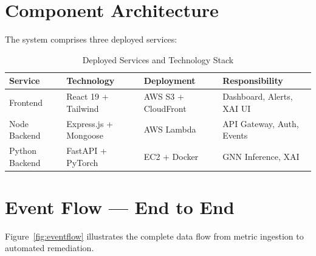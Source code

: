 \documentclass[12pt,a4paper]{report}
\begin{document}
\section{Component Architecture}

The system comprises three deployed services:

\begin{table}[H]
\centering
\caption{Deployed Services and Technology Stack}
\begin{tabular}{p{2.5cm} p{3.5cm} p{3.5cm} p{4cm}}
\toprule
\textbf{Service} & \textbf{Technology} & \textbf{Deployment} &
\textbf{Responsibility} \\
\midrule
Frontend         & React 19 + Tailwind     & AWS S3 + CloudFront &
  Dashboard, Alerts, XAI UI \\
Node Backend     & Express.js + Mongoose   & AWS Lambda          &
  API Gateway, Auth, Events \\
Python Backend   & FastAPI + PyTorch       & EC2 + Docker        &
  GNN Inference, XAI \\
\bottomrule
\end{tabular}
\end{table}

\section{Event Flow — End to End}

Figure~\ref{fig:eventflow} illustrates the complete data flow from metric
ingestion to automated remediation.
\end{document}
